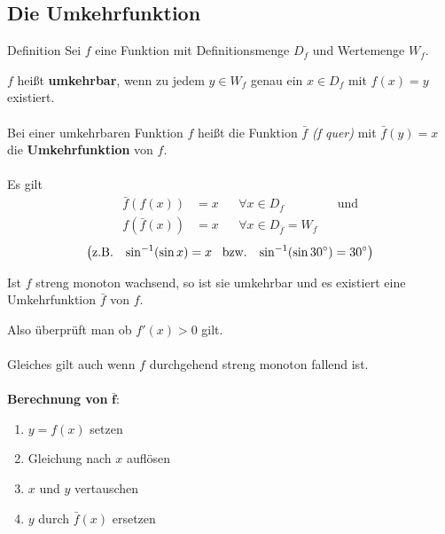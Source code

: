 \documentclass{article}
\begin{document}
\newpage
\subsection{Die Umkehrfunktion}
\begin{boxx}[Red]{Definition}
    Sei $f$ eine Funktion mit Definitionsmenge $D_f$ und Wertemenge $W_f$.

    $f$ heißt \textbf{umkehrbar}, wenn zu jedem $y \in W_f$ genau ein
    $x \in D_f$ mit $f(x) = y$ existiert.
    \\\\
    Bei einer umkehrbaren Funktion $f$ heißt die Funktion $\bar{f}$ \emph{(f quer)} mit
    $\bar{f}(y)=x$ die \textbf{Umkehrfunktion} von $f$.
    \\\\
    Es gilt
    \begin{align*}
        &&&& \bar{f}\left(f(x)\right) &= x & & \forall x \in D_f &&\text{und} && \\
        &&&& f\left(\bar{f}(x)\right) &= x & & \forall x \in D_{\bar{f}} = W_f &&&&
    \end{align*}
    \[\left(\text{z.B.}\;\;\; \sin^{-1}(\sin x)= x \;\;\;\text{bzw.}\;\;\;\sin^{-1}(\sin 30\degree)= 30\degree\right)\]
\end{boxx}

Ist $f$ streng monoton wachsend, so ist sie umkehrbar und es existiert eine Umkehrfunktion $\bar{f}$ von $f$.

Also überprüft man ob $f'(x) > 0$ gilt. 
\\\\
Gleiches gilt auch wenn $f$ durchgehend streng monoton fallend ist.
\\\\
\textbf{Berechnung von } $\mathbf{\bar{f}:}$

\begin{enumerate}
    \item $y = f(x)$ setzen
    \item Gleichung nach $x$ auflösen
    \item $x$ und $y$ vertauschen
    \item $y$ durch $\bar{f}(x)$ ersetzen
\end{enumerate}
\end{document}
